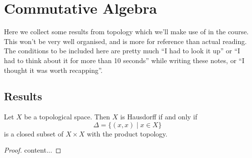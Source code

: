 \chapter{Commutative Algebra}
Here we collect some results from topology which we'll make use of in the course.
This won't be very well organised, and is more for reference than actual reading.
The conditions to be included here are pretty much \enquote{I had to look it up} or \enquote{I had to think about it for more than 10 seconds} while writing these notes, or \enquote{I thought it was worth recapping}.

\section{Results}

\begin{lma}{}{}
    Let \(X\) be a topological space.
    Then \(X\) is Hausdorff if and only if
    \begin{equation}
        \Delta = \{(x, x) \mid x \in X\}
    \end{equation}
    is a closed subset of \(X \times X\) with the product topology.
    \begin{proof}
        content...
    \end{proof}
\end{lma}
